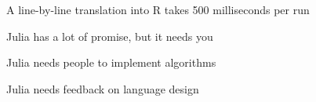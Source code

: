 \documentclass{beamer}
\begin{document}
\frame
{
	\begin{center}
		A line-by-line translation into R takes 500 milliseconds per run
	\end{center}
}

\frame
{
	\begin{center}
		Julia has a lot of promise, but it needs you
	\end{center}
}

\frame
{
	\begin{center}
		Julia needs people to implement algorithms
	\end{center}
}

\frame
{
	\begin{center}
		Julia needs feedback on language design
	\end{center}
}
\end{document}
